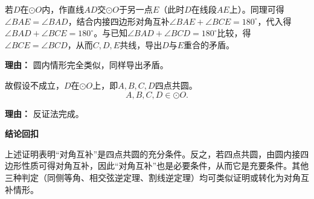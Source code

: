 \begin{proofbox}
\begin{description}[style=nextline, leftmargin=2.8em, labelsep=0.5em, itemsep=0.55em]
		\item[\textbf{步骤七（圆内情形）：}] 若$D$在$\odot O$内，作直线$AD$交$\odot O$于另一点$E$（此时$D$在线段$AE$上）。同理可得$\angle BAE = \angle BAD$，结合内接四边形对角互补$\angle BAE + \angle BCE = 180^{\circ}$，代入得$\angle BAD + \angle BCE = 180^{\circ}$。与已知$\angle BAD + \angle BCD = 180^{\circ}$比较，得$\angle BCE = \angle BCD$，从而$C,D,E$共线，导出$D$与$E$重合的矛盾。
			\par\textbf{理由：} 圆内情形完全类似，同样导出矛盾。

		\item[\textbf{步骤八（结论）：}] 故假设不成立，$D$在$\odot O$上，即$A,B,C,D$四点共圆。
			\[
				A,B,C,D\in\odot O.
			\]
			\par\textbf{理由：} 反证法完成。
	\end{description}

	\medskip
	\textbf{\textcolor{CProof}{结论回扣}}

	上述证明表明“对角互补”是四点共圆的充分条件。反之，若四点共圆，由圆内接四边形性质可得对角互补，因此“对角互补”也是必要条件，从而它是充要条件。其他三种判定（同侧等角、相交弦逆定理、割线逆定理）均可类似证明或转化为对角互补情形。
\end{proofbox}
